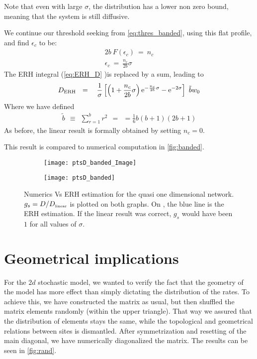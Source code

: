 Note that even with large $\sigma$, the distribution has a lower non zero bound, meaning that the system is still diffusive.


We continue our threshold seeking from \autoref{eq:thres_banded}, using this 
flat profile, and find $\epsilon_c$ to be:
%
\begin{align}
2b\ F(\epsilon_c) \ =\ n_c \\
\epsilon_c\ = \ \frac{n_c}{2b}\sigma
\end{align}
%
The ERH integral (\autoref{eq:ERH_D} )is replaced by a sum, leading to
\begin{align}
D_{\text{ERH}} \ \ = \ \ 
\ \frac{1}{\sigma}\left[ 
\left(1+\frac{n_c}{2b}\sigma\right)\eexp{-\frac{n_c}{2b}\sigma} - \eexp{-2\sigma}
\right] \ \tilde{b} w_0
\end{align}
Where we have defined
%
\begin{align}
\tilde{b} \ \ \equiv \ \ \sum_{r=1}^b r^2 \ \ = \ \ = \frac{1}{6}b(b+1)(2b+1)
\end{align}
%
As before, the linear result is formally obtained by setting $n_c=0$.

This result is compared to numerical computation in \autoref{fig:banded}.

\begin{figure}
\begin{subfigure}{0.49\textwidth}
\texttt{[image: ptsD\_banded\_Image]}
\label{fig:band_image}
\end{subfigure}
\begin{subfigure}{0.49\textwidth}
\texttt{[image: ptsD\_banded]}
\label{fig:band_b10}
\end{subfigure}
\caption[Banded network]{Numerics Vs ERH estimation for the quasi one dimensional network. $g_s = D/D_{\mbox{\tiny linear}}$ is plotted on both graphs.
On \subref{fig:band_b10}, the blue line is the ERH estimation. If the
linear result was correct, $g_s$ would have been $1$ for all values of $\sigma$.}
\label{fig:banded}
\end{figure}



\section{Geometrical implications}


For the $2d$ stochastic model, we wanted to verify the fact that
the geometry of the model has more effect than simply dictating the distribution
of the rates. To achieve this, we have constructed the matrix as usual, but
then shuffled the matrix elements randomly (within the upper triangle). That way
we assured that the distribution of elements stays the same, while the topological
and geometrical relations between sites is dismantled. After symmetrization
and resetting of the main diagonal, we have numerically diagonalized the matrix. The
results can be seen in \autoref{fig:rand}.


